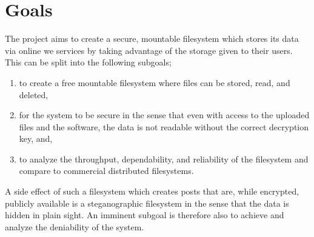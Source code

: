 
\section{Goals}


The project aims to create a secure, mountable filesystem which stores its data via online we services by taking advantage of the storage given to their users. This can be split into the following subgoals;
\begin{enumerate}
\item to create a free mountable filesystem where files can be stored, read, and deleted, %
\item for the system to be secure in the sense that even with access to the uploaded files and the software, the data is not readable without the correct decryption key, and, %
\item to analyze the throughput, dependability, and reliability of the filesystem and compare to commercial distributed filesystems.
\end{enumerate}


A side effect of such a filesystem which creates posts that are, while encrypted, publicly available is a steganographic filesystem in the sense that the data is hidden in plain sight. An imminent subgoal is therefore also to achieve and analyze the deniability of the system.


